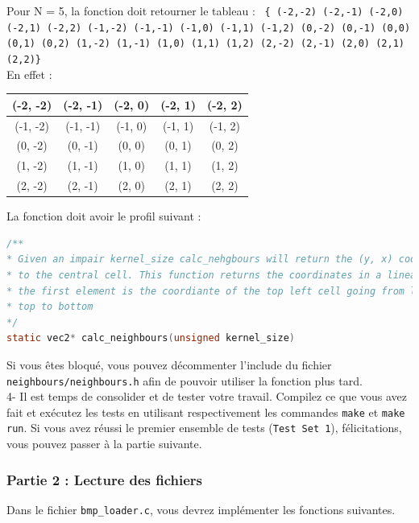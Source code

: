 \documentclass[a4paper]{article}
\begin{document}
	Pour N = 5, la fonction doit retourner le tableau : \texttt{ \{ (-2,-2) (-2,-1) (-2,0) (-2,1) (-2,2) (-1,-2) (-1,-1) (-1,0) (-1,1) (-1,2) (0,-2) (0,-1) (0,0) (0,1) (0,2) (1,-2) (1,-1) (1,0) (1,1) (1,2) (2,-2) (2,-1) (2,0) (2,1) (2,2)\} } \\
	En effet : 
	\begin{center}
		\begin{tabular}{ | c | c | c | c | c | } 
		\hline
		(-2, -2) & (-2, -1) & (-2, 0) & (-2, 1) & (-2, 2) \\
		\hline
		(-1, -2) & (-1, -1) & (-1, 0) & (-1, 1) & (-1, 2) \\
		\hline
		(0, -2) & (0, -1) & (0, 0) & (0, 1) & (0, 2) \\
		\hline
		(1, -2) & (1, -1) & (1, 0) & (1, 1) & (1, 2) \\
		\hline
		(2, -2) & (2, -1) & (2, 0) & (2, 1) & (2, 2) \\
		\hline
		\end{tabular}
	\end{center}
	La fonction doit avoir le profil suivant : 
	\begin{lstlisting}[language=C]
/**
* Given an impair kernel_size calc_nehgbours will return the (y, x) coordinates relative
* to the central cell. This function returns the coordinates in a linear array where
* the first element is the coordiante of the top left cell going from left to right and from
* top to bottom
*/ 
static vec2* calc_neighbours(unsigned kernel_size)
	\end{lstlisting}
	Si vous êtes bloqué, vous pouvez décommenter l'include du fichier \texttt{neighbours/neighbours.h} afin de pouvoir utiliser la fonction plus tard.\\
	
	4- Il est temps de consolider et de tester votre travail. Compilez ce que vous avez fait et exécutez les tests en utilisant respectivement les commandes \texttt{make} et \texttt{make run}. Si vous avez réussi le premier ensemble de tests (\texttt{Test Set 1}), félicitations, vous pouvez passer à la partie suivante.
	\subsubsection*{Partie 2 : Lecture des fichiers}
	Dans le fichier \texttt{bmp\_loader.c}, vous devrez implémenter les fonctions suivantes. \\
	
\end{document}
